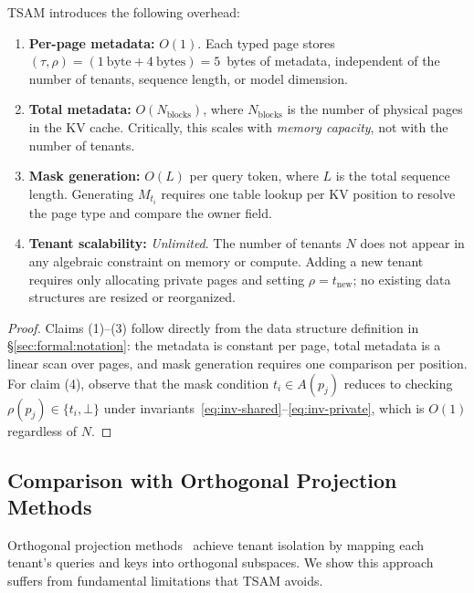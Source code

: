 \begin{proposition}
\label{prop:complexity}
TSAM introduces the following overhead:
\begin{enumerate}[leftmargin=1.5em,itemsep=2pt]
    \item \textbf{Per-page metadata:} $O(1)$. Each typed page stores
          $(\tau, \rho) = (1~\text{byte} + 4~\text{bytes}) = 5$~bytes of metadata,
          independent of the number of tenants, sequence length, or model dimension.
    \item \textbf{Total metadata:} $O(N_{\mathrm{blocks}})$, where $N_{\mathrm{blocks}}$
          is the number of physical pages in the KV cache. Critically, this scales with
          \emph{memory capacity}, not with the number of tenants.
    \item \textbf{Mask generation:} $O(L)$ per query token, where $L$ is the total
          sequence length. Generating $M_{t_i}$ requires one table lookup per KV position
          to resolve the page type and compare the owner field.
    \item \textbf{Tenant scalability:} \emph{Unlimited}. The number of tenants $N$
          does not appear in any algebraic constraint on memory or compute. Adding a new
          tenant requires only allocating private pages and setting $\rho = t_{\mathrm{new}}$;
          no existing data structures are resized or reorganized.
\end{enumerate}
\end{proposition}

\begin{proof}
Claims (1)--(3) follow directly from the data structure definition in
\S\ref{sec:formal:notation}: the metadata is constant per page, total metadata is a linear
scan over pages, and mask generation requires one comparison per position. For claim (4),
observe that the mask condition $t_i \in A(p_j)$ reduces to checking $\rho(p_j) \in \{t_i, \bot\}$
under invariants~\eqref{eq:inv-shared}--\eqref{eq:inv-private}, which is $O(1)$ regardless
of $N$.
\end{proof}

\subsection{Comparison with Orthogonal Projection Methods}
\label{sec:formal:orthogonal}

Orthogonal projection methods~\cite{li2024orthogonal} achieve tenant isolation by mapping
each tenant's queries and keys into orthogonal subspaces. We show this approach suffers
from fundamental limitations that TSAM avoids.

